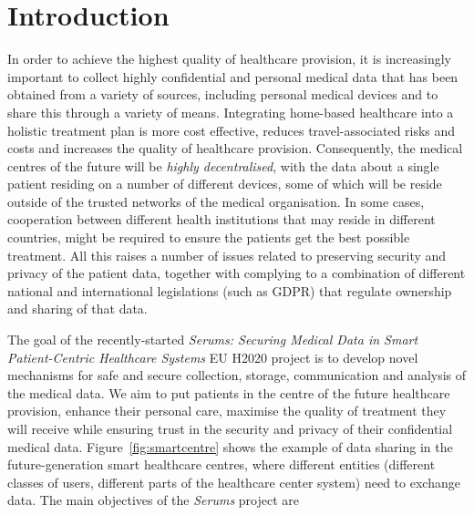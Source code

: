 \documentclass[sigconf]{acmart}
\begin{document}
%

%

%
\maketitle

\section{Introduction}

\noindent
In order to achieve the highest quality of healthcare provision, it is increasingly important to collect highly confidential and personal medical data that has been obtained from a variety of sources, including personal medical devices and to share this through a variety of means. Integrating home-based healthcare into a holistic treatment plan is more cost effective, reduces travel-associated risks and costs and increases the quality of healthcare provision. Consequently, the medical centres of the future will be \emph{highly decentralised}, with the data about a single patient residing on a number of different devices, some of which will be reside outside of the trusted networks of the medical organisation. In some cases, cooperation between different health institutions that may reside in different countries, might be required to ensure the patients get the best possible treatment. All this raises a number of issues related to preserving security and privacy of the patient data, together with complying to a combination of different national and international legislations (such as GDPR) that regulate ownership and sharing of that data.

The goal of the recently-started \emph{Serums: Securing Medical Data in Smart Patient-Centric Healthcare Systems} EU H2020 project is to develop novel mechanisms for safe and secure collection, storage, communication and analysis of the medical data. We aim to put patients in the centre of the future healthcare provision, enhance their personal care, maximise the quality of treatment they will receive while ensuring trust in the security and privacy of their confidential medical data. Figure~\ref{fig:smartcentre} shows the example of data sharing in the future-generation smart healthcare centres, where different entities (different classes of users, different parts of the healthcare center system) need to exchange data. The main objectives of the \emph{Serums} project are 
\end{document}
